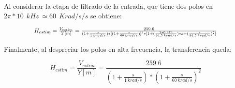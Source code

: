 \noindent Al considerar la etapa de filtrado de la entrada, que tiene dos polos en $2\pi *10\: \:{kHz}\ \simeq 60\: \:{Krad/s}/s$ se obtiene:

\begin{equation} \label{eq_TLC_deriv_6}
	\resizebox{.8\hsize}{!}
	{
		$
	H_{estim}=\frac{V_{estim}}{Y[m]}=\frac{259.6}{(1+\frac{s}{1\: krad/s})*{[(1+\frac{s}{60\: krad/s})]}^2*[1+(\frac{2*0.473}{94,5\: krad/s})*s+(\frac{s}{94,5\: krad/s})^2]}
	$
	}
\end{equation}

\noindent Finalmente, al despreciar los polos en alta frecuencia, la transferencia queda:

\begin{equation} \label{eq_TLC_deriv_7}
	H_{estim}=\frac{V_{estim}}{Y[m]}=\frac{259.6}{(1+\frac{s}{1\: krad/s})*{(1+\frac{s}{60\: krad/s})}^2}
\end{equation}